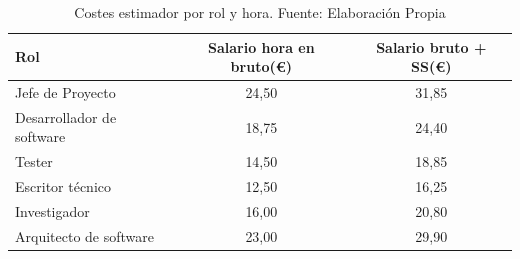 \documentclass[12pt]{article}
\begin{document}
    \begin{table}[H]
        \begin{center}
            \begin{tabular}{ |l|c|c| } \hline
                Rol                       & Salario hora en bruto(\euro)  & Salario bruto + SS(\euro)  \\ \hline
                Jefe de Proyecto          & 24,50                         & 31,85                      \\ \hline
                Desarrollador de software & 18,75                         & 24,40                      \\ \hline
                Tester                    & 14,50                         & 18,85                      \\ \hline
                Escritor técnico          & 12,50                         & 16,25                      \\ \hline
                Investigador              & 16,00                         & 20,80                      \\ \hline
                Arquitecto de software    & 23,00                         & 29,90                      \\  \hline        
            \end{tabular}
        \caption{Costes estimador por rol y hora. Fuente: Elaboración Propia}
        \label{tab:salarios}   
        \end{center}
    \end{table}
    
\end{document}
